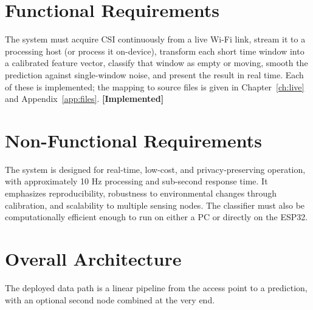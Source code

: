 \documentclass[11pt,a4paper,oneside]{report}
\newcommand{\evidencetag}[2]{{\small\sffamily\bfseries\textcolor{#1}{[#2]}}}
\newcommand{\Impl}{\evidencetag{good}{Implemented}}
\begin{document}
\section{Functional Requirements}

The system must acquire CSI continuously from a live Wi-Fi link, stream it to a
processing host (or process it on-device), transform each short time window into
a calibrated feature vector, classify that window as empty or moving, smooth the
prediction against single-window noise, and present the result in real time.
Each of these is implemented; the mapping to source files is given in
Chapter~\ref{ch:live} and Appendix~\ref{app:files}. \Impl

\section{Non-Functional Requirements}

The system is designed for real-time, low-cost, and privacy-preserving operation, with approximately 10 Hz processing and sub-second response time. It emphasizes reproducibility, robustness to environmental changes through calibration, and scalability to multiple sensing nodes. The classifier must also be computationally efficient enough to run on either a PC or directly on the ESP32.

\section{Overall Architecture}

The deployed data path is a linear pipeline from the access point to a
prediction, with an optional second node combined at the very end.
\end{document}
